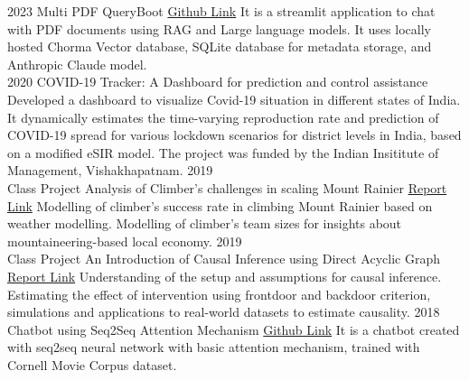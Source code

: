\documentclass[10pt]{developercv} %
\begin{document}
\begin{entrylist}
    \vspace{-10pt}
    \entry
    {2023}
    {Multi PDF QueryBoot}
    {\href{https://github.com/subroy13/multi-pdf-querybot}{Github Link}}
    {It is a streamlit application to chat with PDF documents using RAG and Large language models. It uses locally hosted Chorma Vector database, SQLite database for metadata storage, and Anthropic Claude model.}
    \vspace{-5pt}\\
    \entry
    {2020}
    {COVID-19 Tracker: A Dashboard for prediction and control assistance}
    {}
    {Developed a dashboard to visualize Covid-19 situation in different states of India. It dynamically estimates the time-varying reproduction rate and prediction of COVID-19 spread for various lockdown scenarios for district levels in India, based on a modified eSIR model. The project was funded by the Indian Insititute of Management, Vishakhapatnam.}
    \entry
    {2019\\Class Project}
    {Analysis of Climber's challenges in scaling Mount Rainier}
    {\href{https://github.com/subroy13/mount-rainier-case-study}{Report Link} }
    {Modelling of climber's success rate in climbing Mount Rainier based on weather modelling. Modelling of climber's team sizes for insights about mountaineering-based local economy.}
    \entry
    {2019\\Class Project}
    {An Introduction of Causal Inference using Direct Acyclic Graph}
    {\href{https://www.statwizard.in/aboutme/causal-dag/final-report.pdf}{Report Link} }
    {Understanding of the setup and assumptions for causal inference. Estimating the effect of intervention using frontdoor and backdoor criterion, simulations and applications to real-world datasets to estimate causality.}
    \entry
    {2018}
    {Chatbot using Seq2Seq Attention Mechanism}
    {\href{https://github.com/subroy13/seq2seq-attention-bot}{Github Link}}
    {It is a chatbot created with seq2seq neural network with basic attention mechanism, trained with Cornell Movie Corpus dataset.}
\end{entrylist}

\end{document}
